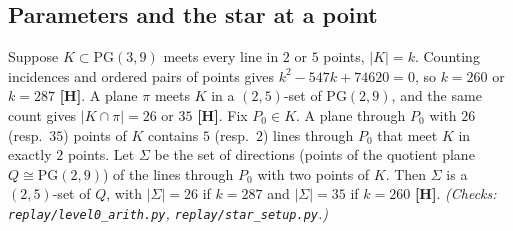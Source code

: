 \documentclass[11pt]{article}
\theoremstyle{plain}
\theoremstyle{remark}
\newcommand{\PG}{\mathrm{PG}}
\newcommand{\file}[1]{\texttt{#1}}
\begin{document}
\subsection{Parameters and the star at a point}\label{sec:star}
Suppose $K\subset\PG(3,9)$ meets every line in $2$ or $5$ points, $|K|=k$.
Counting incidences and ordered pairs of points gives $k^2-547k+74620=0$, so $k=260$ or $k=287$ \textbf{[H]}.
A plane $\pi$ meets $K$ in a $(2,5)$-set of $\PG(2,9)$, and the same count gives $|K\cap\pi|=26$ or $35$ \textbf{[H]}.
Fix $P_0\in K$.
A plane through $P_0$ with $26$ (resp.\ $35$) points of $K$ contains $5$ (resp.\ $2$) lines through $P_0$ that meet $K$ in exactly $2$ points.
Let $\Sigma$ be the set of directions (points of the quotient plane $Q\cong\PG(2,9)$) of the lines through $P_0$ with two points of $K$.
Then $\Sigma$ is a $(2,5)$-set of $Q$, with $|\Sigma|=26$ if $k=287$ and $|\Sigma|=35$ if $k=260$ \textbf{[H]}.
\emph{(Checks: \file{replay/level0\_arith.py}, \file{replay/star\_setup.py}.)}
\end{document}
